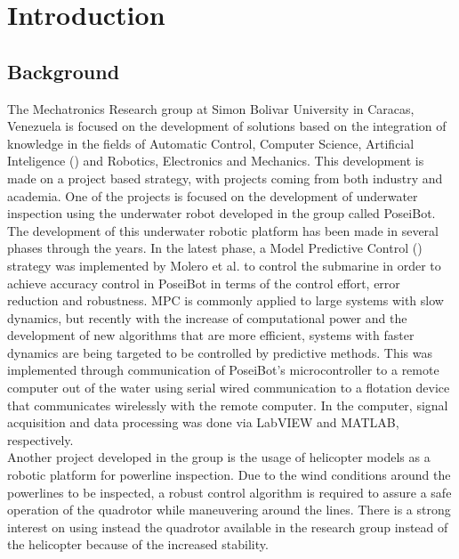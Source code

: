 \chapter{Introduction}
\label{chap:Introduction}
%
%
%
%

\section{Background}

The Mechatronics Research group at Simon Bolivar University in Caracas, Venezuela is focused on the development of solutions based on the integration of knowledge in the fields of Automatic Control, Computer Science, Artificial Inteligence () and Robotics, Electronics and Mechanics. This development is made on a project based strategy, with projects coming from both industry and academia. One of the projects is focused on the development of underwater inspection using the underwater robot developed in the group called PoseiBot. The development of this underwater robotic platform has been made in several phases through the years. In the latest phase, a Model Predictive Control () strategy was implemented by Molero et al. \cite{Molero2011} to control the submarine in order to achieve accuracy control in PoseiBot in terms of the control effort, error reduction and robustness. MPC is commonly applied to large systems with slow dynamics, but recently with the increase of computational power and the development of new algorithms that are more efficient, systems with faster dynamics are being targeted to be controlled by predictive methods. This was implemented through communication of PoseiBot's microcontroller to a remote computer out of the water using serial wired communication to a flotation device that communicates wirelessly with the remote computer. In the computer, signal acquisition  and data processing was done via LabVIEW \texttrademark  and MATLAB\textsuperscript{\textregistered}, respectively. \\

Another project developed in the group is the usage of helicopter models as a robotic platform for powerline inspection. Due to the wind conditions around the powerlines to be inspected, a robust control algorithm is required to assure a safe operation of the quadrotor while maneuvering around the lines. There is a strong interest on using instead the quadrotor available in the research group instead of the helicopter because of the increased stability. \\

